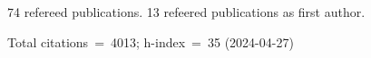 74 refereed publications. 13 refeered publications as first author.

Total citations~=~4013; h-index~=~35 (2024-04-27)